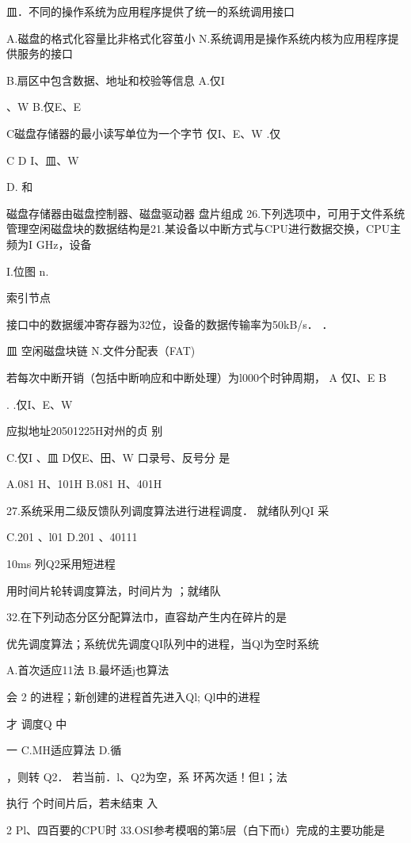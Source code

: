     皿．不同的操作系统为应用程序提供了统一的系统调用接口

   A.磁盘的格式化容量比非格式化容茧小    N.系统调用是操作系统内核为应用程序提供服务的接口

   B.扇区中包含数据、地址和校验等信息    A.仅I

    、W    B.仅E、E

   C磁盘存储器的最小读写单位为一个字节    仅I、E、W    .仅

    C    D   I、皿、W

   D.    和

    磁盘存储器由磁盘控制器、磁盘驱动器  盘片组成    26.下列选项中，可用于文件系统管理空闲磁盘块的数据结构是21.某设备以中断方式与CPU进行数据交换，CPU主频为I GHz，设备

    I.位图    n.

    索引节点

   接口中的数据缓冲寄存器为32位，设备的数据传输率为50kB/s．    ．

    皿 空闲磁盘块链    N.文件分配表（FAT)

   若每次中断开销（包括中断响应和中断处理）为l000个时钟周期，    A 仅I、E    B

    .    .仅I、E、W

    应拟地址20501225H对州的贞    别

   C.仅I 、皿    D仅E、田、W    口录号、反号分  是

    A.081 H、101H    B.081 H、401H

27.系统采用二级反馈队列调度算法进行进程调度． 就绪队列QI 采

    C.201  、l01     D.201  、40111

    10ms    列Q2采用短进程

   用时间片轮转调度算法，时间片为    ；就绪队

    32.在下列动态分区分配算法巾，直容劫产生内在碎片的是

   优先调度算法；系统优先调度QI队列中的进程，当Ql为空时系统

    A.首次适应11法    B.最坏适j也算法

    会    2  的进程；新创建的进程首先进入Ql; Ql中的进程

   才  调度Q 中

    一    C.MH适应算法    D.循

    ，则转   Q2． 若当前．l、Q2为空，系    环芮次适！但1；法

   执行 个时间片后，若未结束    入

    2    Pl、四百要的CPU时    33.OSI参考模咽的第5层（白下而t）完成的主要功能是

